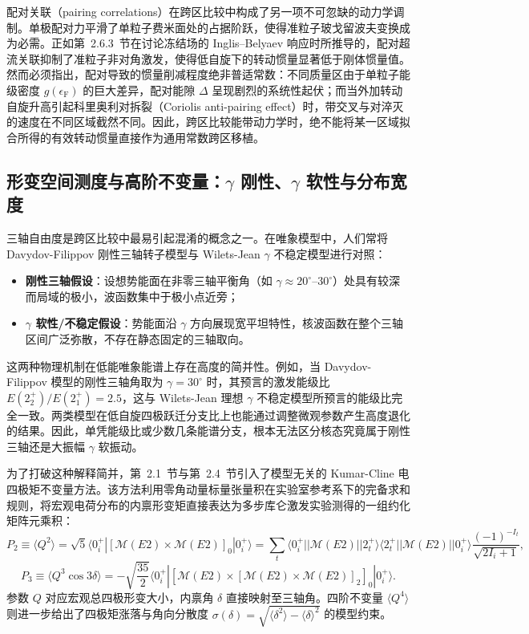 配对关联（pairing correlations）在跨区比较中构成了另一项不可忽缺的动力学调制。单极配对力平滑了单粒子费米面处的占据阶跃，使得准粒子玻戈留波夫变换成为必需。正如第~2.6.3~节在讨论冻结场的 Inglis--Belyaev 响应时所推导的，配对超流关联抑制了准粒子非对角激发，使得低自旋下的转动惯量显著低于刚体惯量值。然而必须指出，配对导致的惯量削减程度绝非普适常数：不同质量区由于单粒子能级密度 $g(\epsilon_{\mathrm{F}})$ 的巨大差异，配对能隙 $\Delta$ 呈现剧烈的系统性起伏；而当外加转动自旋升高引起科里奥利对拆裂（Coriolis anti-pairing effect）时，带交叉与对淬灭的速度在不同区域截然不同。因此，跨区比较能带动力学时，绝不能将某一区域拟合所得的有效转动惯量直接作为通用常数跨区移植。

\subsection{形变空间测度与高阶不变量：$\gamma$ 刚性、$\gamma$ 软性与分布宽度}\label{sec:4-1-3}

三轴自由度是跨区比较中最易引起混淆的概念之一。在唯象模型中，人们常将 Davydov-Filippov 刚性三轴转子模型与 Wilets-Jean $\gamma$ 不稳定模型进行对照：
\begin{itemize}
\item \textbf{刚性三轴假设}：设想势能面在非零三轴平衡角（如 $\gamma \approx 20^\circ\text{--}30^\circ$）处具有较深而局域的极小，波函数集中于极小点近旁；
\item \textbf{$\gamma$ 软性/不稳定假设}：势能面沿 $\gamma$ 方向展现宽平坦特性，核波函数在整个三轴区间广泛弥散，不存在静态固定的三轴取向。
\end{itemize}

这两种物理机制在低能唯象能谱上存在高度的简并性。例如，当 Davydov-Filippov 模型的刚性三轴角取为 $\gamma = 30^\circ$ 时，其预言的激发能级比 $E(2^+_2)/E(2^+_1) = 2.5$，这与 Wilets-Jean 理想 $\gamma$ 不稳定模型所预言的能级比完全一致。两类模型在低自旋四极跃迁分支比上也能通过调整微观参数产生高度退化的结果。因此，单凭能级比或少数几条能谱分支，根本无法区分核态究竟属于刚性三轴还是大振幅 $\gamma$ 软振动。

为了打破这种解释简并，第~2.1~节与第~2.4~节引入了模型无关的 Kumar-Cline 电四极矩不变量方法\cite{cline-1986-nuclear-shapes-coulomb-excitation}。该方法利用零角动量标量张量积在实验室参考系下的完备求和规则，将宏观电荷分布的内禀形变矩直接表达为多步库仑激发实验测得的一组约化矩阵元乘积：
\begin{equation}\label{eq:4-1-q2-invariant}
P_2 \equiv \langle Q^2 \rangle = \sqrt{5} \langle 0^+_i | [\mathcal{M}(E2) \times \mathcal{M}(E2)]_0 | 0^+_i \rangle = \sum_t \langle 0^+_i || \mathcal{M}(E2) || 2^+_t \rangle \langle 2^+_t || \mathcal{M}(E2) || 0^+_i \rangle \frac{(-1)^{-I_t}}{\sqrt{2I_i+1}},
\end{equation}
\begin{equation}\label{eq:4-1-q3-invariant}
P_3 \equiv \langle Q^3 \cos 3\delta \rangle = -\sqrt{\frac{35}{2}} \langle 0^+_i | [\mathcal{M}(E2) \times [\mathcal{M}(E2) \times \mathcal{M}(E2)]_2]_0 | 0^+_i \rangle.
\end{equation}
参数 $Q$ 对应宏观总四极形变大小，内禀角 $\delta$ 直接映射至三轴角。四阶不变量 $\langle Q^4 \rangle$ 则进一步给出了四极矩涨落与角向分散度 $\sigma(\delta) = \sqrt{\langle \delta^2 \rangle - \langle \delta \rangle^2}$ 的模型约束。

